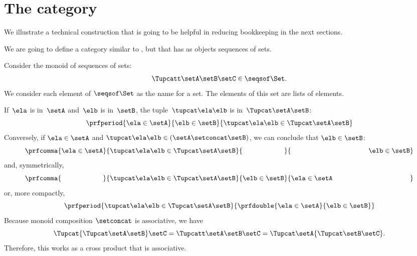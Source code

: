 \section{The \SetL category}
\label{sec:SetL}

We illustrate a technical construction that is going to be helpful in reducing bookkeeping in the next sections.

We are going to define a category similar to \Set, but that has as objects sequences of sets.

Consider the monoid of sequences of sets:
%
\begin{equation}
	\label{eq:sets-monoid}
	\Tupcatt \setA  \setB  \setC \in \seqsof\Set.
\end{equation}
%
We consider each element of $\seqsof\Set$ as the name for a set.
The elements of this set are lists of elements.

If~$\ela$ is in~$\setA$ and~$\elb$ is in~$\setB$, the tuple~$\tupcat \ela \elb$ is in~$\Tupcat \setA \setB$:
%
\begin{equation}
	\label{eq:sets-monoid-axiom1}
	\prfperiod{
		\ela \in \setA
	}{
		\elb \in \setB
	}{
		\tupcat \ela \elb \in \Tupcat \setA \setB
	}
\end{equation}
%
Conversely, if $\ela \in \setA$ and $\tupcat \ela \elb \in (\setA \setconcat \setB)$, we can conclude that $\elb \in \setB$:
%
\begin{equation}
	\label{eq:sets-monoid-axiom2}
	\prfcomma{
		\ela \in \setA
	}{
		\tupcat \ela \elb \in \Tupcat \setA  \setB
	}{
		\phantom{\elb \in \setB}
	}{
		\rule{39mm}{0pt} \elb \in  \setB
	}
\end{equation}
%
and, symmetrically,
%
\begin{equation}
	\label{eq:sets-monoid-axiom3}
	\prfcomma{
		\phantom{\ela \in \setA}
	}{
		\tupcat \ela \elb \in \Tupcat \setA \setB
	}{
		\elb \in \setB
	}{
		\ela \in  \setA \rule{39mm}{0pt}
	}
\end{equation}
%
or, more compactly,
%
\begin{equation}
	\label{eq:sets-monoid-axiom3bis}
	\prfperiod{
		\tupcat \ela \elb \in \Tupcat \setA \setB
	}{
		\prfdouble{
			\ela \in \setA
		}{
			\elb \in \setB
		}
	}
\end{equation}
%
Because monoid composition $\setconcat$ is associative, we have
%
\begin{equation}
	\label{eq:sets-monoid-comp}
	\Tupcat {\Tupcat \setA  \setB}  \setC  =
	\Tupcatt \setA    \setB \setC  =
	\Tupcat   \setA  {\Tupcat \setB  \setC}.
\end{equation}
%
Therefore, this works as a cross product that is associative.


